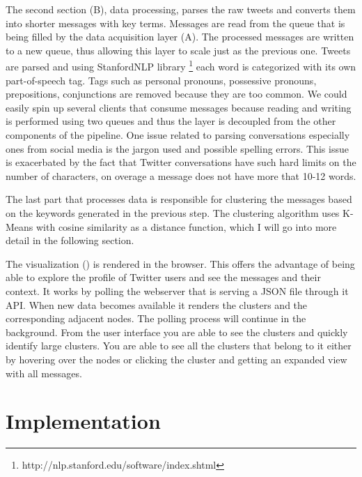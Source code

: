 The second section (B), data processing, parses the raw tweets and converts them into shorter messages with key terms. Messages are read from the queue that is being filled by the data acquisition layer (A). The processed messages are written to a new queue, thus allowing this layer to scale just as the previous one. Tweets are parsed and using StanfordNLP library \footnote{http://nlp.stanford.edu/software/index.shtml} each word is categorized with its own part-of-speech tag. Tags such as personal pronouns, possessive pronouns, prepositions, conjunctions are removed because they are too common. We could easily spin up several clients that consume messages because reading and writing is performed using two queues and thus the layer is decoupled from the other components of the pipeline. One issue related to parsing conversations especially ones from social media is the jargon used and possible spelling errors. This issue is exacerbated by the fact that Twitter conversations have such hard limits on the number of characters, on overage a message does not have more that 10-12 words.

The last part that processes data is responsible for clustering the messages based on the keywords generated in the previous step. The clustering algorithm uses K-Means with cosine similarity as a distance function, which I will go into more detail in the following section.

The visualization ({\frontend})  is rendered in the browser. This offers the advantage of being able to explore the profile of Twitter users and see the messages and their context. It works by polling the webserver that is serving a JSON file through it API. When new data becomes available it renders the clusters and the corresponding adjacent nodes. The polling process will continue in the background. From the user interface you are able to see the clusters and quickly identify large clusters. You are able to see all the clusters that belong to it either by hovering over the nodes or clicking the cluster and getting an expanded view with all messages.

\section{Implementation}
\label{sec:implementation}

